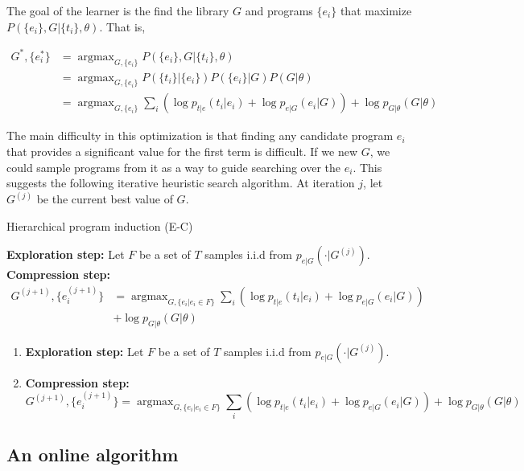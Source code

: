 \documentclass{article}
\DeclareMathOperator*{\argmax}{argmax}
\begin{document}
The goal of the learner is the find the library $G$ and programs
$\{e_i\}$ that maximize $P(\{e_i\}, G | \{t_i\}, \theta)$. That is, 

\begin{align}
G^*, \{e^*_i\} &= \argmax_{G, \{e_i\} }
   P(\{e_i\}, G | \{t_i\}, \theta)\\
&= \argmax_{G, \{e_i\} } P(\{t_i\} | \{e_i\})
  P(\{e_i\} | G) P(G | \theta)\\
&= \argmax_{G, \{e_i\} }
  \sum_i \left( 
  \log{p_{t|e}(t_i|e_i)}+ 
  \log{p_{e|G}(e_i|G)}
  \right ) +
  \log{p_{G|\theta}(G|\theta)}
\label{eq:objective}
\end{align}

The main difficulty in this optimization is that finding any candidate
program $e_i$ that provides a significant value for the first term is
difficult. If we new $G$, we could sample programs from it as a way to
guide searching over the $e_i$. This suggests the following iterative
heuristic search algorithm. At iteration $j$, let $G^{(j)}$ be the
current best value of $G$. 

\begin{algorithm}
\caption{Hierarchical program induction (E-C)}\label{alg:basic-progind}
\begin{algorithmic}[1]
\State  \textbf{Exploration step: } Let $F$ be a set of $T$ samples
  i.i.d from $p_{e|G}(\cdot | G^{(j)})$.
\State \textbf{Compression step: } 
\begin{align*}
G^{(j+1)}, \{e^{(j+1)}_i\} &= 
\argmax_{G, \{e_i | e_i \in F \}}
\sum_i \left( 
\log{p_{t|e}(t_i|e_i)}+ 
\log{p_{e|G}(e_i|G)} \right )\\
&+
\log{p_{G|\theta}(G|\theta)}
\end{align*}
\end{algorithmic}
\end{algorithm}

\begin{enumerate}
\item \textbf{Exploration step: } Let $F$ be a set of $T$ samples
  i.i.d from $p_{e|G}(\cdot | G^{(j)})$.
\item \textbf{Compression step: } 
$$G^{(j+1)}, \{e^{(j+1)}_i\} = 
\argmax_{G, \{e_i | e_i \in F \}}
\sum_i \left( 
\log{p_{t|e}(t_i|e_i)}+ 
\log{p_{e|G}(e_i|G)}
\right ) +
\log{p_{G|\theta}(G|\theta)}
$$
\end{enumerate}

\subsection{An online algorithm}
\end{document}
